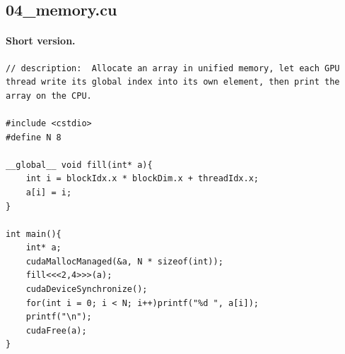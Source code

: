 \documentclass[main.tex]{subfiles}
\begin{document}
\subsection{04\_memory.cu}
\paragraph{Short version.}
\begin{lstlisting}[language=CUDA]
// description:  Allocate an array in unified memory, let each GPU thread write its global index into its own element, then print the array on the CPU.

#include <cstdio>
#define N 8

__global__ void fill(int* a){
    int i = blockIdx.x * blockDim.x + threadIdx.x;
    a[i] = i;
}

int main(){
    int* a;
    cudaMallocManaged(&a, N * sizeof(int));
    fill<<<2,4>>>(a);
    cudaDeviceSynchronize();
    for(int i = 0; i < N; i++)printf("%d ", a[i]);
    printf("\n");
    cudaFree(a);
}
\end{lstlisting}
\end{document}
